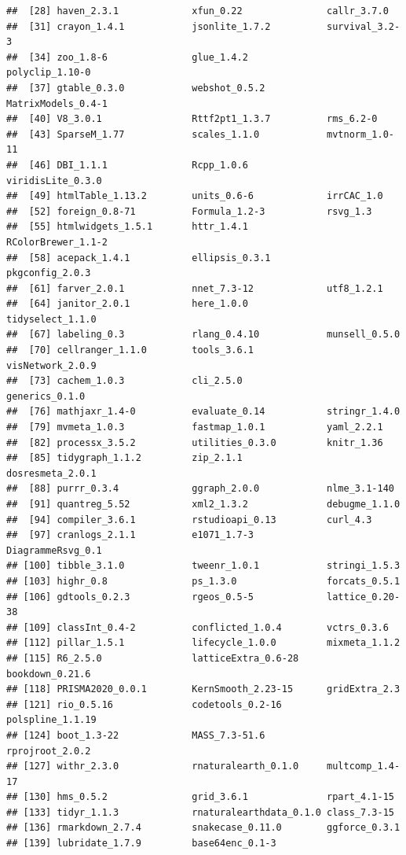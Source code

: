 \documentclass[a4paper, twoside]{templates/ociamthesis}
\begin{document}
\begin{verbatim}
##  [28] haven_2.3.1             xfun_0.22               callr_3.7.0            
##  [31] crayon_1.4.1            jsonlite_1.7.2          survival_3.2-3         
##  [34] zoo_1.8-6               glue_1.4.2              polyclip_1.10-0        
##  [37] gtable_0.3.0            webshot_0.5.2           MatrixModels_0.4-1     
##  [40] V8_3.0.1                Rttf2pt1_1.3.7          rms_6.2-0              
##  [43] SparseM_1.77            scales_1.1.0            mvtnorm_1.0-11         
##  [46] DBI_1.1.1               Rcpp_1.0.6              viridisLite_0.3.0      
##  [49] htmlTable_1.13.2        units_0.6-6             irrCAC_1.0             
##  [52] foreign_0.8-71          Formula_1.2-3           rsvg_1.3               
##  [55] htmlwidgets_1.5.1       httr_1.4.1              RColorBrewer_1.1-2     
##  [58] acepack_1.4.1           ellipsis_0.3.1          pkgconfig_2.0.3        
##  [61] farver_2.0.1            nnet_7.3-12             utf8_1.2.1             
##  [64] janitor_2.0.1           here_1.0.0              tidyselect_1.1.0       
##  [67] labeling_0.3            rlang_0.4.10            munsell_0.5.0          
##  [70] cellranger_1.1.0        tools_3.6.1             visNetwork_2.0.9       
##  [73] cachem_1.0.3            cli_2.5.0               generics_0.1.0         
##  [76] mathjaxr_1.4-0          evaluate_0.14           stringr_1.4.0          
##  [79] mvmeta_1.0.3            fastmap_1.0.1           yaml_2.2.1             
##  [82] processx_3.5.2          utilities_0.3.0         knitr_1.36             
##  [85] tidygraph_1.1.2         zip_2.1.1               dosresmeta_2.0.1       
##  [88] purrr_0.3.4             ggraph_2.0.0            nlme_3.1-140           
##  [91] quantreg_5.52           xml2_1.3.2              debugme_1.1.0          
##  [94] compiler_3.6.1          rstudioapi_0.13         curl_4.3               
##  [97] cranlogs_2.1.1          e1071_1.7-3             DiagrammeRsvg_0.1      
## [100] tibble_3.1.0            tweenr_1.0.1            stringi_1.5.3          
## [103] highr_0.8               ps_1.3.0                forcats_0.5.1          
## [106] gdtools_0.2.3           rgeos_0.5-5             lattice_0.20-38        
## [109] classInt_0.4-2          conflicted_1.0.4        vctrs_0.3.6            
## [112] pillar_1.5.1            lifecycle_1.0.0         mixmeta_1.1.2          
## [115] R6_2.5.0                latticeExtra_0.6-28     bookdown_0.21.6        
## [118] PRISMA2020_0.0.1        KernSmooth_2.23-15      gridExtra_2.3          
## [121] rio_0.5.16              codetools_0.2-16        polspline_1.1.19       
## [124] boot_1.3-22             MASS_7.3-51.6           rprojroot_2.0.2        
## [127] withr_2.3.0             rnaturalearth_0.1.0     multcomp_1.4-17        
## [130] hms_0.5.2               grid_3.6.1              rpart_4.1-15           
## [133] tidyr_1.1.3             rnaturalearthdata_0.1.0 class_7.3-15           
## [136] rmarkdown_2.7.4         snakecase_0.11.0        ggforce_0.3.1          
## [139] lubridate_1.7.9         base64enc_0.1-3
\end{verbatim}
\end{document}
